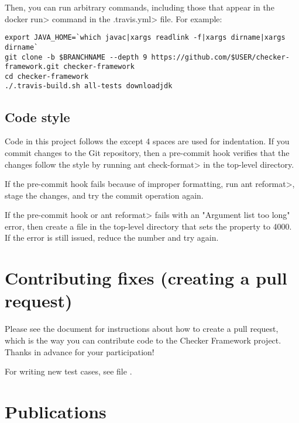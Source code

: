 Then, you can run arbitrary commands, including those that appear in the
\<docker run> command in the \<.travis.yml> file.  For example:

\begin{Verbatim}
export JAVA_HOME=`which javac|xargs readlink -f|xargs dirname|xargs dirname`
git clone -b $BRANCHNAME --depth 9 https://github.com/$USER/checker-framework.git checker-framework
cd checker-framework
./.travis-build.sh all-tests downloadjdk
\end{Verbatim}


\subsection{Code style\label{code-style}}

Code in this project follows the
 except 4 spaces are used for indentation.  If you commit changes to the
Git repository, then a pre-commit hook verifies that the changes follow the
style by running \<ant check-format> in the top-level directory.

If
the pre-commit hook fails
because of improper formatting, run \<ant reformat>, stage the
changes, and try the commit operation again.

If the pre-commit hook or \<ant reformat> fails with an
"Argument list too long" error, then create a  file
in the top-level directory that sets the property  to 4000.  If the error is still issued, reduce the number and
try again.


\section{Contributing fixes (creating a pull request)\label{pull-request}}

Please see the document
 for instructions about how to
create a pull request, which is the way you can contribute code to the
Checker Framework project.  Thanks in advance for your participation!

For writing new test cases, see file
.


\section{Publications\label{publications}\label{learning-more}}

